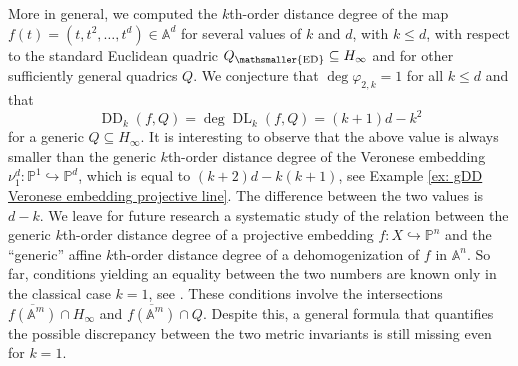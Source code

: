 \documentclass[11pt,reqno]{amsart}
\numberwithin{equation}{section}
\theoremstyle{plain}
\numberwithin{theorem}{section}
\theoremstyle{definition}
\newcommand{\A}{\mathbb{A}}
\renewcommand{\P}{\mathbb{P}}
\newcommand{\DL}{\operatorname{DL}}
\newcommand{\DD}{\operatorname{DD}}
\newcommand{\mED}{\mathsmaller{\mathrm{ED}}}
\begin{document}
More in general, we computed the $k$th-order distance degree of the map $f(t)=(t,t^2,\ldots,t^d)\in\A^d$ for several values of $k$ and $d$, with $k\le d$, with respect to the standard Euclidean quadric $Q_\mED\subseteq H_\infty$ and for other sufficiently general quadrics $Q$. We conjecture that $\deg\varphi_{2,k}=1$ for all $k\le d$ and that
\[
\DD_k(f,Q) = \deg\DL_k(f,Q) = (k+1)d-k^2
\]
for a generic $Q\subseteq H_\infty$. It is interesting to observe that the above value is always smaller than the generic $k$th-order distance degree of the Veronese embedding $\nu_1^d\colon\P^1\hookrightarrow\P^d$, which is equal to $(k+2)d-k(k+1)$, see Example \ref{ex: gDD Veronese embedding projective line}. The difference between the two values is $d-k$. We leave for future research a systematic study of the relation between the generic $k$th-order distance degree of a projective embedding $f\colon X\hookrightarrow\P^n$ and the ``generic'' affine $k$th-order distance degree of a dehomogenization of $f$ in $\A^n$. So far, conditions yielding an equality between the two numbers are known only in the classical case $k=1$, see \cite[Theorem 6.11]{DHOST}. These conditions involve the intersections $\overline{f(\A^m)}\cap H_\infty$ and $\overline{f(\A^m)}\cap Q$. Despite this, a general formula that quantifies the possible discrepancy between the two metric invariants is still missing even for $k=1$.
\end{document}
